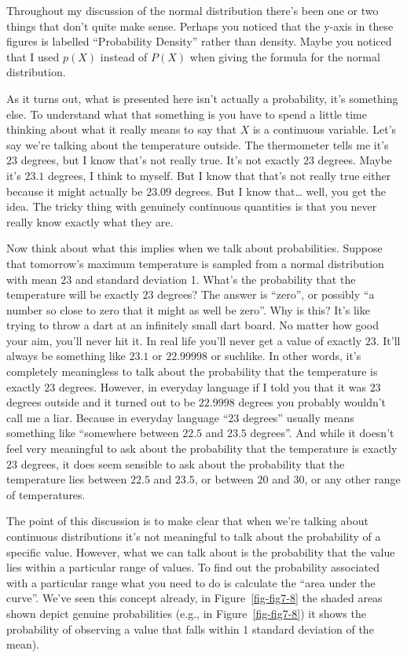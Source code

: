 \documentclass[
  a4paper,
]{book}
\begin{document}
Throughout my discussion of the normal distribution there's been one or
two things that don't quite make sense. Perhaps you noticed that the
y-axis in these figures is labelled ``Probability Density'' rather than
density. Maybe you noticed that I used \(p(X)\) instead of \(P(X)\) when
giving the formula for the normal distribution.

As it turns out, what is presented here isn't actually a probability,
it's something else. To understand what that something is you have to
spend a little time thinking about what it really means to say that
\(X\) is a continuous variable. Let's say we're talking about the
temperature outside. The thermometer tells me it's \(23\) degrees, but I
know that's not really true. It's not exactly \(23\) degrees. Maybe it's
\(23.1\) degrees, I think to myself. But I know that that's not really
true either because it might actually be \(23.09\) degrees. But I know
that\ldots{} well, you get the idea. The tricky thing with genuinely
continuous quantities is that you never really know exactly what they
are.

Now think about what this implies when we talk about probabilities.
Suppose that tomorrow's maximum temperature is sampled from a normal
distribution with mean \(23\) and standard deviation 1. What's the
probability that the temperature will be exactly \(23\) degrees? The
answer is ``zero'', or possibly ``a number so close to zero that it
might as well be zero''. Why is this? It's like trying to throw a dart
at an infinitely small dart board. No matter how good your aim, you'll
never hit it. In real life you'll never get a value of exactly \(23\).
It'll always be something like \(23.1\) or \(22.99998\) or suchlike. In
other words, it's completely meaningless to talk about the probability
that the temperature is exactly \(23\) degrees. However, in everyday
language if I told you that it was \(23\) degrees outside and it turned
out to be \(22.9998\) degrees you probably wouldn't call me a liar.
Because in everyday language ``\(23\) degrees'' usually means something
like ``somewhere between \(22.5\) and \(23.5\) degrees''. And while it
doesn't feel very meaningful to ask about the probability that the
temperature is exactly \(23\) degrees, it does seem sensible to ask
about the probability that the temperature lies between \(22.5\) and
\(23.5\), or between \(20\) and \(30\), or any other range of
temperatures.

The point of this discussion is to make clear that when we're talking
about continuous distributions it's not meaningful to talk about the
probability of a specific value. However, what we can talk about is the
probability that the value lies within a particular range of values. To
find out the probability associated with a particular range what you
need to do is calculate the ``area under the curve''. We've seen this
concept already, in Figure~\ref{fig-fig7-8} the shaded areas shown
depict genuine probabilities (e.g., in Figure~\ref{fig-fig7-8}) it shows
the probability of observing a value that falls within 1 standard
deviation of the mean).
\end{document}
